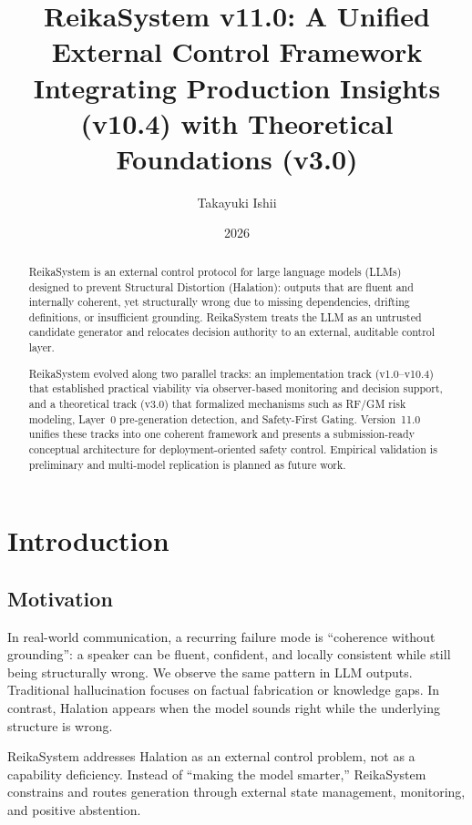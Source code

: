 \documentclass[11pt,a4paper]{article}
\title{ReikaSystem v11.0: A Unified External Control Framework\\
\large Integrating Production Insights (v10.4) with Theoretical Foundations (v3.0)}
\author{Takayuki Ishii}
\date{2026}
\begin{document}
\maketitle

\begin{abstract}
ReikaSystem is an external control protocol for large language models (LLMs) designed to
prevent Structural Distortion (Halation): outputs that are fluent and internally coherent, yet
structurally wrong due to missing dependencies, drifting definitions, or insufficient grounding.
ReikaSystem treats the LLM as an untrusted candidate generator and relocates decision
authority to an external, auditable control layer.

ReikaSystem evolved along two parallel tracks: an implementation track (v1.0--v10.4)
that established practical viability via observer-based monitoring and decision support, and
a theoretical track (v3.0) that formalized mechanisms such as RF/GM risk modeling, Layer~0
pre-generation detection, and Safety-First Gating. Version~11.0 unifies these tracks into one
coherent framework and presents a submission-ready conceptual architecture for
deployment-oriented safety control. Empirical validation is preliminary and
multi-model replication is planned as future work.
\end{abstract}

\section{Introduction}

\subsection{Motivation}
In real-world communication, a recurring failure mode is ``coherence without grounding'': a
speaker can be fluent, confident, and locally consistent while still being structurally wrong.
We observe the same pattern in LLM outputs. Traditional hallucination focuses on factual
fabrication or knowledge gaps. In contrast, Halation appears when the model sounds right while
the underlying structure is wrong.

ReikaSystem addresses Halation as an external control problem, not as a capability deficiency.
Instead of ``making the model smarter,'' ReikaSystem constrains and routes generation through
external state management, monitoring, and positive abstention.
\end{document}
